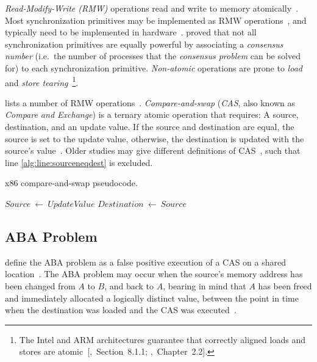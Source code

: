 \emph{Read-Modify-Write (RMW)} operations read and write to memory
atomically~\citep{perfbook2021}. Most synchronization primitives may be
implemented as RMW operations~\citep[Section~5.6]{herlihy2020art}, and
typically need to be implemented in hardware~\citep[Appendix~B.8]{herlihy2020art}.
\citeauthor{herlihy1991wait} proved that not all synchronization primitives are
equally powerful by associating a \emph{consensus number} (i.e.~the number of
processes that the \emph{consensus problem} can be solved for) to each
synchronization primitive. \emph{Non-atomic} operations are prone to \emph{load} and \emph{store
tearing}~\citep[Section~4.3.4]{perfbook2021}\footnote{The Intel and ARM
architectures guarantee that correctly aligned loads and stores are
atomic~[\citealp{intel2021system},~Section~8.1.1;
\citealp{arm2022architecture},~Chapter~2.2].}.

\citeauthor{scott2013shared} lists a number of RMW operations~\citep[Table~2.2]{scott2013shared}.
\emph{Compare-and-swap} (\emph{CAS}, also known as \emph{Compare and Exchange})
is a ternary atomic operation that requires: A source, destination, and an
update value. If the source and destination are equal, the source is set to the
update value, otherwise, the destination is updated with the source's
value~\citep{intel2021inst}.
Older studies may give different definitions of
CAS~\citetext{\citealp{scott2013shared},~Table~2.2;~\citealp{valois1995datastructures},
Appendix~A}, such that line \ref{alg:line:sourceneqdest} is excluded.

\SetNoFillComment
{}
\begin{algorithm}[hbt!]
    \caption{x86 compare-and-swap pseudocode.}\label{alg:cas}
        {
            $Source~\gets~UpdateValue$
        }
        $Destination~\gets~Source$ \label{alg:line:sourceneqdest}
\end{algorithm}


\subsection{ABA Problem}
\citeauthor{dechev2010understanding} define the ABA problem as a false positive
execution of a CAS on a shared location~\citep{dechev2010understanding}. The ABA
problem may occur when the source's memory address has been changed from $A$ to
$B$, and back to $A$, bearing in mind that $A$ has been freed and immediately
allocated a logically distinct value, between the point in time when the
destination was loaded and the CAS was executed~\citep{dechev2010understanding}.

